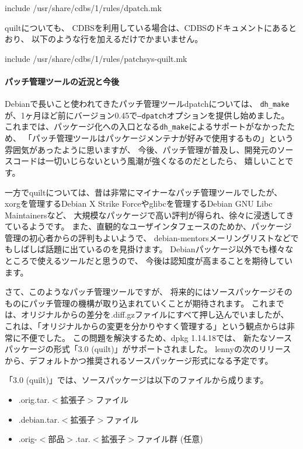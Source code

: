 \documentclass[mingoth,a4paper]{jsarticle}
\begin{document}
\begin{commandline}
include /usr/share/cdbs/1/rules/dpatch.mk
\end{commandline}

quiltについても、
CDBSを利用している場合は、CDBSのドキュメントにあるとおり、
以下のような行を加えるだけでかまいません。

\begin{commandline}
include /usr/share/cdbs/1/rules/patchsys-quilt.mk
\end{commandline}

\begin{screen}
\paragraph*{パッチ管理ツールの近況と今後}

Debianで長いこと使われてきたパッチ管理ツールdpatchについては、
\texttt{dh\_make}が、1ヶ月ほど前にバージョン0.45で\texttt{--dpatch}オプションを提供し始めました。
これまでは、パッケージ化への入口となる\texttt{dh\_make}によるサポートがなかったため、
「パッチ管理ツールはパッケージメンテナが好みで使用するもの」という雰囲気があったように思いますが、
今後、パッチ管理が普及し、開発元のソースコードは一切いじらないという風潮が強くなるのだとしたら、
嬉しいことです。

一方でquiltについては、昔は非常にマイナーなパッチ管理ツールでしたが、
xorgを管理するDebian X Strike Forceやglibcを管理するDebian GNU Libc Maintainersなど、
大規模なパッケージで高い評判が得られ、徐々に浸透してきているようです。
また、直観的なユーザインタフェースのためか、パッケージ管理の初心者からの評判もよいようで、
debian-mentorsメーリングリストなどでもしばしば話題に出ているのを見掛けます。
Debianパッケージ以外でも様々なところで使えるツールだと思うので、
今後は認知度が高まることを期待しています。

さて、このようなパッチ管理ツールですが、
将来的にはソースパッケージそのものにパッチ管理の機構が取り込まれていくことが期待されます。
これまでは、オリジナルからの差分を.diff.gzファイルにすべて押し込んでいましたが、
これは、「オリジナルからの変更を分かりやすく管理する」という観点からは非常に不便でした。
この問題を解決するため、dpkg 1.14.18では、
新たなソースパッケージの形式「3.0 (quilt)」がサポートされました。
lennyの次のリリースから、デフォルトかつ推奨されるソースパッケージ形式になる予定です。

「3.0 (quilt)」では、ソースパッケージは以下のファイルから成ります。

\begin{itemize}
 \item .orig.tar.$<$拡張子$>$ファイル
 \item .debian.tar.$<$拡張子$>$ファイル
 \item .orig-$<$部品$>$.tar.$<$拡張子$>$ファイル群 (任意)
\end{itemize}


\end{screen}
\end{document}
